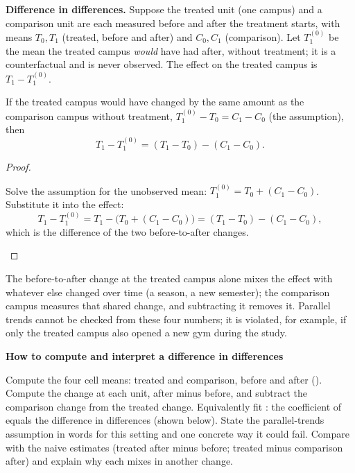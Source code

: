 \documentclass[10pt]{scrartcl}
\newenvironment{howto}[1]{\begin{mdframed}[style=howtostyle]{\color{NavyBlue}\textbf{#1}}\par\vspace{2pt}}{\end{mdframed}}
\begin{document}
\noindent\textbf{Difference in differences.} Suppose the treated unit (one campus) and a comparison unit are each measured before and after the treatment starts, with means $T_0, T_1$ (treated, before and after) and $C_0, C_1$ (comparison). Let $T_1^{(0)}$ be the mean the treated campus \emph{would} have had after, without treatment; it is a counterfactual and is never observed. The effect on the treated campus is $T_1 - T_1^{(0)}$.

\begin{theorem*}
If the treated campus would have changed by the same amount as the comparison campus without treatment, $T_1^{(0)} - T_0 = C_1 - C_0$ (the  assumption), then
\[
  T_1 - T_1^{(0)} = (T_1 - T_0) - (C_1 - C_0).
\]
\end{theorem*}
\begin{proof}
\begin{steps}
  \ii Solve the assumption for the unobserved mean: $T_1^{(0)} = T_0 + (C_1 - C_0)$.
  \ii Substitute it into the effect:
  \[
    T_1 - T_1^{(0)} = T_1 - \big(T_0 + (C_1 - C_0)\big) = (T_1 - T_0) - (C_1 - C_0),
  \]
  which is the difference of the two before-to-after changes.
\end{steps}
\end{proof}
The before-to-after change at the treated campus alone mixes the effect with whatever else changed over time (a season, a new semester); the comparison campus measures that shared change, and subtracting it removes it. Parallel trends cannot be checked from these four numbers; it is violated, for example, if only the treated campus also opened a new gym during the study.

\begin{howto}{How to compute and interpret a difference in differences}
\begin{steps}
  \ii Compute the four cell means: treated and comparison, before and after ().
  \ii Compute the change at each unit, after minus before, and subtract the comparison change from the treated change.
  \ii Equivalently fit : the coefficient of  equals the difference in differences (shown below).
  \ii State the parallel-trends assumption in words for this setting and one concrete way it could fail.
  \ii Compare with the naive estimates (treated after minus before; treated minus comparison after) and explain why each mixes in another change.
\end{steps}
\end{howto}
\end{document}
